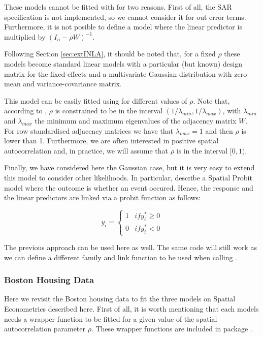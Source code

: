 \documentclass[article]{jss}
\begin{document}
These models cannot be fitted with  for two reasons. First of all, 
the SAR specification is not implemented, so we cannot consider it for out
error terms. Furthermore, it is not posible to define a model 
where the linear predictor is multiplied by $(I_n-\rho W)^{-1}$.

Following Section \ref{sec:extINLA}, it should be noted that, for a fixed
$\rho$ these models become standard linear models with a particular 
(but known) design matrix for the fixed effects and a multivariate Gaussian
distribution with zero mean and variance-covariance matrix.

This model can be easily fitted using  for different values
of $\rho$. Note that, according to \citet{Haining:2003}, $\rho$ is constrained 
to be in the interval $(1/\lambda_{min}, 1/\lambda_{max})$, with
$\lambda_{min}$ and $\lambda_{max}$ the minimum and maximum eigenvalues of
the adjacency matrix $W$. For row standardised adjacency matrices we have that
$\lambda_{max}=1$ and then $\rho$ is lower than 1. Furthermore, we are often
interested in positive spatial autocorrelation and, in practice, we will
assume that $\rho$ is in the interval $[0,1)$.


Finally, we have considered here the Gaussian case, but it is very easy to
extend this model to consider other likelihoods. In particular,
\citet{LeSageetal:2011} describe a Spatial Probit model where the outcome is
whether an event occured. Hence, the response and the linear predictors are
linked via a probit function as follows:

$$
y_i=
\left\{
\begin{array}{cc}
1 & if y^*_i\geq 0\\
0 & if y^*_i < 0
\end{array}
\right.
$$

The previous approach can be used here as well. The same code will still work
as we can define a different family and link function to be used when calling
.

\subsubsection{Boston Housing Data}

Here we revisit the Boston housing data to fit the three models on Spatial
Econometrics described here. First of all, it is worth mentioning that each
models needs a wrapper function to be fitted for a given value of the
spatial autocorrelation parameter $\rho$. These wrapper functions are
included in  package .
\end{document}
